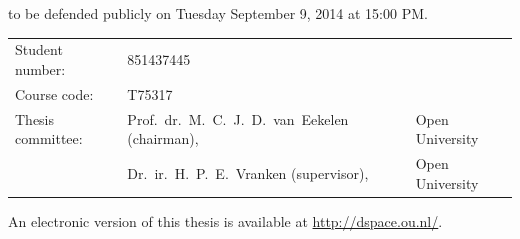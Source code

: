\begin{titlepage}
\begin{center}
to be defended publicly on Tuesday September 9, 2014 at 15:00 PM.

\vfill

\begin{tabular}{lll}
    Student number: & 851437445 \\
    Course code: & T75317 \\
    Thesis committee:
        & Prof.\ dr.\ M.\ C.\ J.\ D.\ van\ Eekelen (chairman), & Open University \\
        & Dr.\ ir.\ H.\ P.\ E.\ Vranken (supervisor), & Open University
\end{tabular}

\bigskip

\bigskip
An electronic version of this thesis is available at \url{http://dspace.ou.nl/}.

\end{center}

\end{titlepage} 